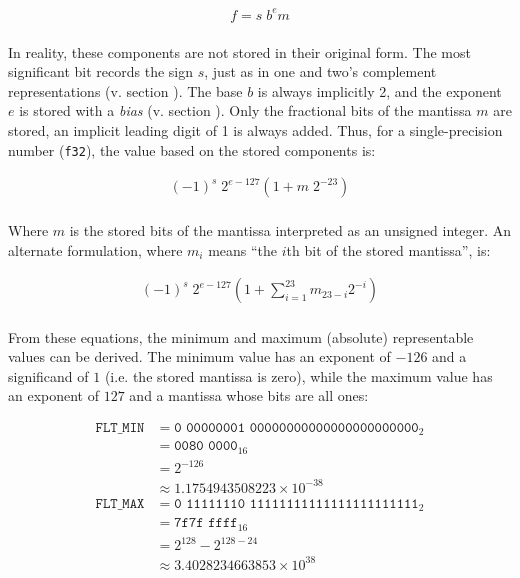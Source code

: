 \begin{align*}
f = s \; b^e m \\
\end{align*}

In reality, these components are not stored in their original form.  The most
significant bit records the sign $s$, just as in one and two's complement
representations (v. section ).  The base
$b$ is always implicitly 2, and the exponent $e$ is stored with a \textit{bias}
(v. section ).  Only the fractional bits of the
mantissa $m$ are stored, an implicit leading digit of 1 is always added.  Thus,
for a single-precision number (\texttt{f32}), the value based on the stored
components is:

\begin{align*}
    (-1)^s \; 2^{e - 127} \left(1 + m \; 2^{-23}\right) \\
\end{align*}

Where $m$ is the stored bits of the mantissa interpreted as an unsigned integer.
An alternate formulation, where $m_i$ means ``the $i$th bit of the stored
mantissa'', is:

\begin{align*}
    (-1)^s \; 2^{e - 127} \left(1 + \sum_{i=1}^{23} m_{23-i} 2^{-i}\right) \\
\end{align*}

From these equations, the minimum and maximum (absolute) representable values
can be derived.  The minimum value has an exponent of $-126$ and a significand
of $1$ (i.e. the stored mantissa is zero), while the maximum value has an
exponent of $127$ and a mantissa whose bits are all ones:

\begin{align*}
    \texttt{FLT\_MIN} &= \texttt{0 00000001 00000000000000000000000}_2 \\
                      &= \texttt{0080 0000}_{16} \\
                      &= 2^{-126} \\
                      &\approx 1.1754943508223 \times 10^{-38} \\
    \texttt{FLT\_MAX} &= \texttt{0 11111110 11111111111111111111111}_2 \\
                      &= \texttt{7f7f ffff}_{16} \\
                      &= 2^{128} - 2^{128 - 24} \\
                      &\approx 3.4028234663853 \times 10^{38} \\
\end{align*}

